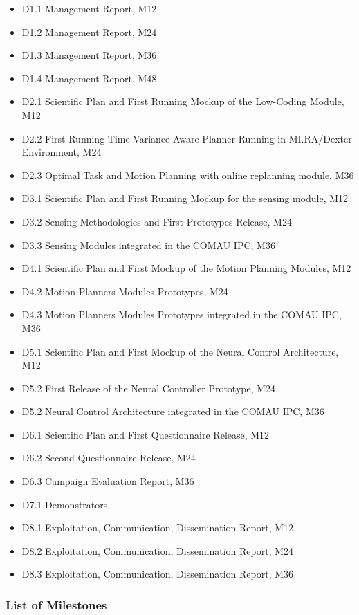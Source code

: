 \begin{itemize}[dot]
\item
  D1.1 Management Report, M12
\item
  D1.2 Management Report, M24
\item
  D1.3 Management Report, M36
\item
  D1.4 Management Report, M48
\item
  D2.1 Scientific Plan and First Running Mockup of the Low-Coding
  Module, M12
\item
  D2.2 First Running Time-Variance Aware Planner Running in MI.RA/Dexter
  Environment, M24
\item
  D2.3 Optimal Task and Motion Planning with online replanning module,
  M36
\item
  D3.1 Scientific Plan and First Running Mockup for the sensing module,
  M12
\item
  D3.2 Sensing Methodologies and First Prototypes Release, M24
\item
  D3.3 Sensing Modules integrated in the COMAU IPC, M36
\item
  D4.1 Scientific Plan and First Mockup of the Motion Planning Modules,
  M12
\item
  D4.2 Motion Planners Modules Prototypes, M24
\item
  D4.3 Motion Planners Modules Prototypes integrated in the COMAU IPC,
  M36
\item
  D5.1 Scientific Plan and First Mockup of the Neural Control
  Architecture, M12
\item
  D5.2 First Release of the Neural Controller Prototype, M24
\item
  D5.2 Neural Control Architecture integrated in the COMAU IPC, M36
\item
  D6.1 Scientific Plan and First Questionnaire Release, M12
\item
  D6.2 Second Questionnaire Release, M24
\item
  D6.3 Campaign Evaluation Report, M36
\item
  D7.1 Demonstrators
\item
  D8.1 Exploitation, Communication, Dissemination Report, M12
\item
  D8.2 Exploitation, Communication, Dissemination Report, M24
\item
  D8.3 Exploitation, Communication, Dissemination Report, M36
\end{itemize}

\subsubsection{List of Milestones}\label{list-of-milestones}

